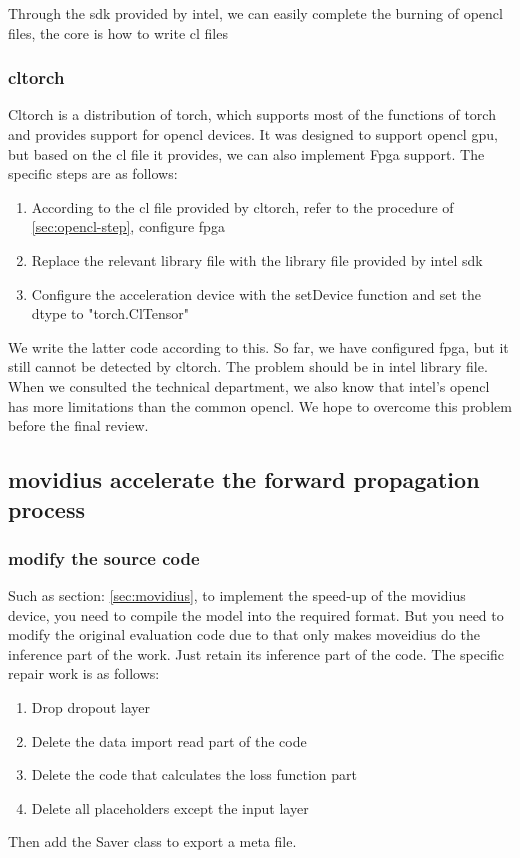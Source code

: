 Through the sdk provided by intel, we can easily complete the burning of opencl files, the core is how to write cl files\subsubsection{cltorch}
Cltorch is a distribution of torch, which supports most of the functions of torch and provides support for opencl devices. It was designed to support opencl gpu, but based on the cl file it provides, we can also implement Fpga support. The specific steps are as follows:
\begin{enumerate}
  \item According to the cl file provided by cltorch, refer to the procedure of \ref{sec:opencl-step}, configure fpga
  \item Replace the relevant library file with the library file provided by intel sdk
  \item Configure the acceleration device with the setDevice function and set the dtype to "torch.ClTensor"
\end{enumerate}
We write the latter code according to this. 
So far, we have configured fpga, but it still cannot be detected by cltorch. The problem should be in intel library file. When we consulted the technical department, we also know that intel's opencl has more limitations than the common opencl. We hope to overcome this problem before the final review.
\subsection{movidius accelerate the forward propagation process}
\subsubsection{modify the source code}

Such as section: \ref{sec:movidius}, to implement the speed-up of the movidius device, you need to compile the model into the required format.
But you need to modify the original evaluation code due to that only makes moveidius do the inference part of the work. Just retain its inference part of the code. The specific repair work is as follows:
\begin{enumerate}
    \item Drop dropout layer
    \item Delete the data import read part of the code
     \item  Delete the code that calculates the loss function part
     \item  Delete all placeholders except the input layer
\end{enumerate}
Then add the Saver class to export a meta file.

